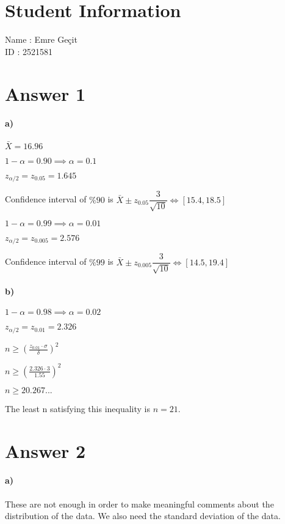 \documentclass[12pt]{article}
\begin{document}
\section*{Student Information}

Name : Emre Geçit\\

ID : 2521581\\



\section*{Answer 1}
\paragraph{a)}
$\bar{X} = 16.96$

$1-\alpha = 0.90 \implies \alpha = 0.1$

$z_{\alpha/2} = z_{0.05} = 1.645$

Confidence interval of $\%90$ is $\bar{X} \pm z_{0.05}\dfrac{3}{\sqrt{10}} \Leftrightarrow [15.4, 18.5]$

$1-\alpha = 0.99 \implies \alpha = 0.01$

$z_{\alpha/2} = z_{0.005} = 2.576$

Confidence interval of $\%99$ is $\bar{X} \pm z_{0.005}\dfrac{3}{\sqrt{10}} \Leftrightarrow [14.5, 19.4]$
\paragraph{b)}
$1-\alpha = 0.98 \implies \alpha = 0.02$

$z_{\alpha/2} = z_{0.01} = 2.326$
\begin{center}
$n \geq (\frac{z_{0.01}\cdot\sigma}{\delta})^2$
\end{center}
\begin{center}
    $n \geq (\frac{2.326\cdot3}{1.55})^2$
\end{center}
\begin{center}
    $n \geq 20.267...$
\end{center}

The least n satisfying this inequality is $n = 21$.
\newpage
\section*{Answer 2}
\paragraph{a)}
These are not enough in order to make meaningful comments about the distribution of the data. We also need the standard deviation of the data.
\end{document}
